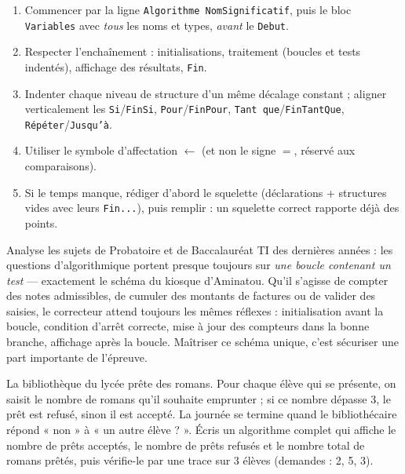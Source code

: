 \documentclass[11pt]{article}
\begin{document}
\begin{methode}
\begin{enumerate}
\item Commencer par la ligne \texttt{Algorithme NomSignificatif}, puis le bloc \texttt{Variables} avec \emph{tous} les noms et types, \emph{avant} le \texttt{Debut}.
\item Respecter l'enchaînement : initialisations, traitement (boucles et tests indentés), affichage des résultats, \texttt{Fin}.
\item Indenter chaque niveau de structure d'un même décalage constant ; aligner verticalement les \texttt{Si}/\texttt{FinSi}, \texttt{Pour}/\texttt{FinPour}, \texttt{Tant que}/\texttt{FinTantQue}, \texttt{Répéter}/\texttt{Jusqu'à}.
\item Utiliser le symbole d'affectation $\leftarrow$ (et non le signe $=$, réservé aux comparaisons).
\item Si le temps manque, rédiger d'abord le squelette (déclarations + structures vides avec leurs \texttt{Fin...}), puis remplir : un squelette correct rapporte déjà des points.
\end{enumerate}
\end{methode}

\begin{savaistu}
Analyse les sujets de Probatoire et de Baccalauréat TI des dernières années : les questions d'algorithmique portent presque toujours sur \emph{une boucle contenant un test} — exactement le schéma du kiosque d'Aminatou. Qu'il s'agisse de compter des notes admissibles, de cumuler des montants de factures ou de valider des saisies, le correcteur attend toujours les mêmes réflexes : initialisation avant la boucle, condition d'arrêt correcte, mise à jour des compteurs dans la bonne branche, affichage après la boucle. Maîtriser ce schéma unique, c'est sécuriser une part importante de l'épreuve.
\end{savaistu}

\begin{exercice}
La bibliothèque du lycée prête des romans. Pour chaque élève qui se présente, on saisit le nombre de romans qu'il souhaite emprunter ; si ce nombre dépasse 3, le prêt est refusé, sinon il est accepté. La journée se termine quand le bibliothécaire répond « non » à « un autre élève ? ». Écris un algorithme complet qui affiche le nombre de prêts acceptés, le nombre de prêts refusés et le nombre total de romans prêtés, puis vérifie-le par une trace sur 3 élèves (demandes : 2, 5, 3).
\end{exercice}
\end{document}
